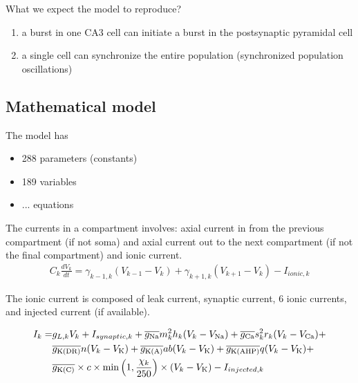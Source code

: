 What we expect the model to reproduce?
\begin{enumerate}
\item a burst in one CA3 cell can initiate a burst in the postsynaptic
  pyramidal cell
\item a single cell can synchronize the entire population
  (synchronized population oscillations)
\end{enumerate}

\subsection{Mathematical model}
\label{sec:mathematical-model-3}

The model has
\begin{itemize}
\item 288 parameters (constants)
\item 189 variables
\item ... equations
\end{itemize}

The currents in a compartment involves: axial current in from the
previous compartment (if not soma) and axial current out to the next
compartment (if not the final compartment) and ionic current.
\begin{eqnarray}
  \label{eq:534}
  C_k\frac{dV_k}{dt} = \gamma_{k-1,k} (V_{k-1}-V_k) +
  \gamma_{k+1,k}(V_{k+1}-V_k) - I_{ionic,k}
\end{eqnarray}

The ionic current is composed of leak current, synaptic current, 6
ionic currents, and injected current (if available).

\begin{equation}
  \label{eq:535}
  \begin{split}
  I_{k} = &g_{L,k}V_k + I_{synaptic,k} +
  \overline{g_{\ce{Na}}}m_k^2h_k(V_k-V_{\ce{Na}}) +
  \overline{g_{\ce{Ca}}}s_k^2r_k(V_k-V_{\ce{Ca}}) +\\
  &\overline{g_{\ce{K(DR)}}}n(V_k-V_{\ce{K}}) +
  \overline{g_{\ce{K(A)}}}ab(V_k-V_{\ce{K}}) +
  \overline{g_{\ce{K(AHP)}}}q(V_k-V_{\ce{K}}) + \\
  &\overline{g_{\ce{K(C)}}}\times c
  \times \min\left(1,\frac{\chi_k}{250}\right)\times (V_k-V_{\ce{K}}) -
  I_{injected,k}
  \end{split}
\end{equation}

